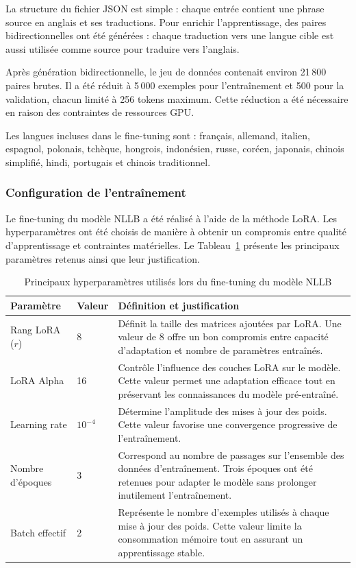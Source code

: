 La structure du fichier JSON est simple : chaque entrée contient une phrase source en anglais et ses traductions. Pour enrichir l'apprentissage, des paires bidirectionnelles ont été générées : chaque traduction vers une langue cible est aussi utilisée comme source pour traduire vers l'anglais.

Après génération bidirectionnelle, le jeu de données contenait environ 21\,800 paires brutes. Il a été réduit à 5\,000 exemples pour l'entraînement et 500 pour la validation, chacun limité à 256 tokens maximum. Cette réduction a été nécessaire en raison des contraintes de ressources GPU.

Les langues incluses dans le fine-tuning sont : français, allemand, italien, espagnol, polonais, tchèque, hongrois, indonésien, russe, coréen, japonais, chinois simplifié, hindi, portugais et chinois traditionnel.

\subsubsection{Configuration de l'entraînement}

Le fine-tuning du modèle NLLB a été réalisé à l'aide de la méthode LoRA. Les hyperparamètres ont été choisis de manière à obtenir un compromis entre qualité d'apprentissage et contraintes matérielles. Le Tableau~\ref{tab:hyperparametres_nllb} présente les principaux paramètres retenus ainsi que leur justification.

\begin{table}[H]
\centering
\caption{Principaux hyperparamètres utilisés lors du fine-tuning du modèle NLLB}
\label{tab:hyperparametres_nllb}
\begin{tabular}{|p{3cm}|p{1.5cm}|p{10cm}|}
\hline
\textbf{Paramètre} & \textbf{Valeur} & \textbf{Définition et justification} \\
\hline
Rang LoRA ($r$) & 8 & Définit la taille des matrices ajoutées par LoRA. Une valeur de 8 offre un bon compromis entre capacité d'adaptation et nombre de paramètres entraînés. \\
\hline
LoRA Alpha & 16 & Contrôle l'influence des couches LoRA sur le modèle. Cette valeur permet une adaptation efficace tout en préservant les connaissances du modèle pré-entraîné. \\
\hline
Learning rate & $10^{-4}$ & Détermine l'amplitude des mises à jour des poids. Cette valeur favorise une convergence progressive de l'entraînement. \\
\hline
Nombre d'époques & 3 & Correspond au nombre de passages sur l'ensemble des données d'entraînement. Trois époques ont été retenues pour adapter le modèle sans prolonger inutilement l'entraînement. \\
\hline
Batch effectif & 2 & Représente le nombre d'exemples utilisés à chaque mise à jour des poids. Cette valeur limite la consommation mémoire tout en assurant un apprentissage stable. \\
\hline
\end{tabular}
\end{table}

